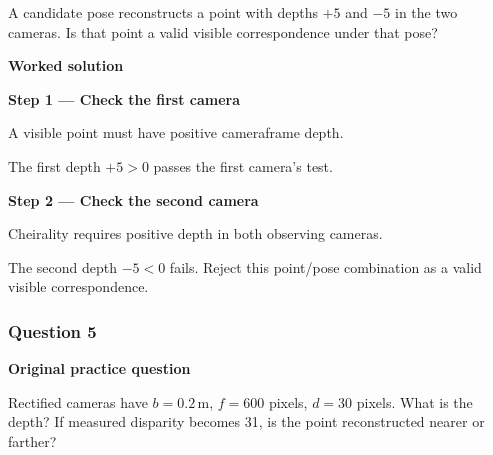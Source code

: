 \documentclass[letterpaper,11pt,english,openany,oneside]{jupyterBook}
\begin{document}
\sphinxAtStartPar
A candidate pose reconstructs a point with depths \(+5\) and \(-5\) in the two cameras. Is that point a valid visible correspondence under that pose?

\par\medskip

\par\medskip
\textbf{Worked solution}\par\smallskip

\par\medskip{}
{\color{QuizStepRed}\bfseries Step 1 — Check the first camera}\par\smallskip

\sphinxAtStartPar
{} A visible point must have positive camera\sphinxhyphen{}frame depth.

\sphinxAtStartPar
The first depth {\color{QuizMathBlue} \(+5>0\)} passes the first camera’s test.

\par

\par\medskip{}
{\color{QuizStepRed}\bfseries Step 2 — Check the second camera}\par\smallskip

\sphinxAtStartPar
{} Cheirality requires positive depth in both observing cameras.

\sphinxAtStartPar
The second depth {\color{QuizMathBlue} \(-5<0\)} fails. Reject this point/pose combination as a valid visible correspondence.

\par

\par\medskip


\subsubsection{Question 5}
\label{\detokenize{lectures/lecture04/tldr:question-5}}\label{\detokenize{lectures/lecture04/tldr:lec04-tldr-q5}}
\par\medskip\textbf{Original practice question}\par\smallskip

\sphinxAtStartPar
Rectified cameras have \(b=0.2\,\mathrm m\), \(f=600\) pixels, \(d=30\) pixels. What is the depth? If measured disparity becomes 31, is the point reconstructed nearer or farther?

\par\medskip
\end{document}
